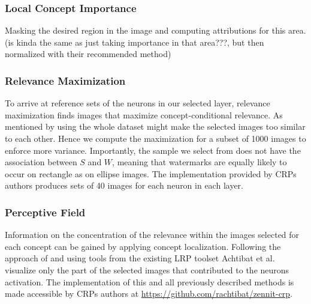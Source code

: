 \subsubsection{Local Concept Importance}
Masking the desired region in the image and computing attributions for this area. (is kinda the same as just taking importance in that area???, but then normalized with their recommended method)


{\color{gray} \subsubsection{Relevance Maximization}
To arrive at reference sets of the neurons in our selected layer, relevance maximization finds images that maximize concept-conditional relevance. As mentioned by \cite{Achtibat2022} using the whole dataset might make the selected images too similar to each other. Hence we compute the maximization for a subset of 1000 images to enforce more variance. Importantly, the sample we select from does not have the association between $S$ and $W$, meaning that watermarks are equally likely to occur on rectangle as on ellipse images. 
The implementation provided by CRPs authors produces sets of 40 images for each neuron in each layer. 

\subsubsection{Perceptive Field}
Information on the concentration of the relevance within the images selected for each concept can be gained by applying concept localization. Following the approach of \cite{Yeh2020} and using tools from the existing LRP toolset \cite{Anders2023} Achtibat et al. visualize only the part of the selected images that contributed to the neurons activation. 
The implementation of this and all previously described methods is made accessible by CRPs authors at \url{https://github.com/rachtibat/zennit-crp}.
}


